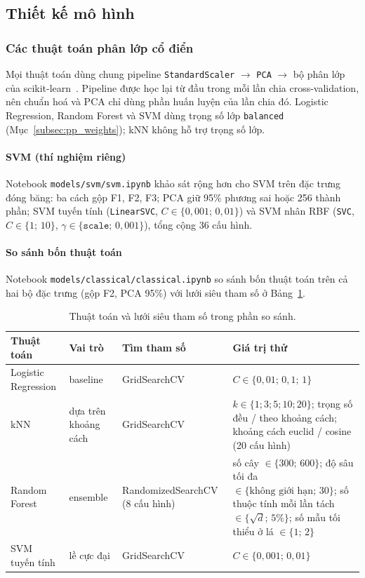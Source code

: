 \subsection{Thiết kế mô hình}
\label{sec:model}

\subsubsection{Các thuật toán phân lớp cổ điển}
\label{subsec:classical_design}

Mọi thuật toán dùng chung pipeline \texttt{StandardScaler} $\rightarrow$ \texttt{PCA} $\rightarrow$ bộ phân lớp của scikit-learn~\cite{sklearn}. Pipeline được học lại từ đầu trong mỗi lần chia cross-validation, nên chuẩn hoá và PCA chỉ dùng phần huấn luyện của lần chia đó. Logistic Regression, Random Forest và SVM dùng trọng số lớp \texttt{balanced} (Mục~\ref{subsec:pp_weights}); kNN không hỗ trợ trọng số lớp.

\paragraph*{SVM (thí nghiệm riêng)} Notebook \texttt{models/svm/svm.ipynb} khảo sát rộng hơn cho SVM trên đặc trưng đóng băng: ba cách gộp F1, F2, F3; PCA giữ 95\% phương sai hoặc 256 thành phần; SVM tuyến tính (\texttt{LinearSVC}, $C\in\{0{,}001;\,0{,}01\}$) và SVM nhân RBF (\texttt{SVC}, $C\in\{1;\,10\}$, $\gamma\in\{\texttt{scale};\,0{,}001\}$), tổng cộng 36 cấu hình.

\paragraph*{So sánh bốn thuật toán} Notebook \texttt{models/classical/classical.ipynb} so sánh bốn thuật toán trên cả hai bộ đặc trưng (gộp F2, PCA 95\%) với lưới siêu tham số ở Bảng~\ref{tab:grids}.

\begin{table}[H]
  \centering
  \caption{Thuật toán và lưới siêu tham số trong phần so sánh.}
  \label{tab:grids}
  \small
  \begin{tabular}{@{}p{}p{}p{}p{}@{}}
    \toprule
    \textbf{Thuật toán} & \textbf{Vai trò} & \textbf{Tìm tham số} & \textbf{Giá trị thử} \\
    \midrule
    Logistic Regression & baseline & GridSearchCV & $C\in\{0{,}01;\,0{,}1;\,1\}$ \\
    kNN & dựa trên khoảng cách & GridSearchCV & $k\in\{1;3;5;10;20\}$; trọng số đều / theo khoảng cách; khoảng cách euclid / cosine (20 cấu hình) \\
    Random Forest & ensemble & RandomizedSearchCV (8 cấu hình) & số cây $\in\{300;\,600\}$; độ sâu tối đa $\in\{\text{không giới hạn};\,30\}$; số thuộc tính mỗi lần tách $\in\{\sqrt{d};\,5\%\}$; số mẫu tối thiểu ở lá $\in\{1;\,2\}$ \\
    SVM tuyến tính & lề cực đại & GridSearchCV & $C\in\{0{,}001;\,0{,}01\}$ \\
    \bottomrule
  \end{tabular}
\end{table}

